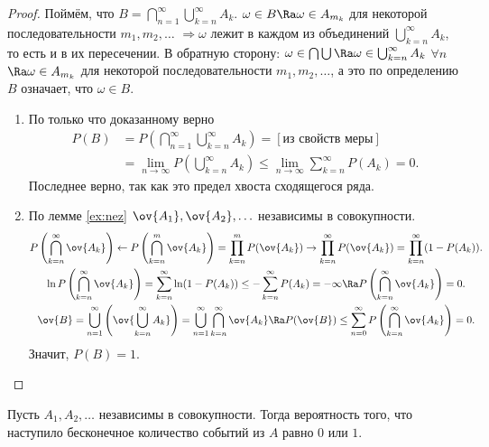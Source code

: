  \begin{proof}
      Поймём, что $B = \bigcap\limits_{n = 1}^\infty \bigcup_{k = n}^\infty A_k$. 
     $\omega \in B \Ra \omega \in A_{m_k} $ для некоторой последовательности $m_1,m_2, \ldots$ $\Rightarrow \omega$ лежит в каждом из объединений
     $\bigcup_{k = n}^\infty A_k$, то есть и в их пересечении.
     В обратную сторону:  $\omega \in \bigcap\bigcup \Ra \omega\in\bigcup_{k = n}^\infty A_k $ $\forall n$ $\Ra \omega\in A_{m_k}$ для
     некоторой последовательности $m_1, m_2, \ldots$, а это по определению $B$ означает, что $\omega\in B$.
    \begin{enumerate}
        \item По только что доказанному верно
        \begin{align*}
            P(B) &= P\left(\bigcap_{n = 1}^\infty \bigcup_{k = n}^\infty A_k\right) = [\text{из свойств меры}]
            \\ &= \underset{n\to \infty}{\lim}
         P\left(\bigcup_{k = n}^\infty A_k\right) \le \underset{n\to\infty}{\lim} \sum_{k = n}^\infty P(A_k) = 0.
        \end{align*}
        Последнее верно, так как это предел хвоста сходящегося ряда.
        \item По лемме \ref{ex:nez} $\ov{A_1}, \ov{A_2}, \ldots$ независимы в совокупности.
        \begin{gather*}
            P\left(\bigcap_{k = n}^\infty \ov{A_k}\right) \leftarrow P\left(\bigcap_{k = n}^m \ov{A_k}\right) = \prod_{k = n}^m P(\ov{A_k}) \rightarrow  \prod_{k = n}^\infty
         P(\ov{A_k}) =  \prod_{k = n}^\infty (1 - P(A_k)).\\
          \ln P\left(\bigcap_{k = n}^\infty \ov{A_k}\right) = \sum_{k = n}^\infty \ln (1 - P(A_k)) \le - \sum_{k = n}^\infty P(A_k)  = -\infty \Ra
         P\left(\bigcap_{k = n}^\infty \ov{A_k}\right) = 0.\\
         \ov{B} = \bigcup_{n = 1}^\infty\left(\ov{\bigcup_{k = n}^\infty A_k}\right) = \bigcup_{n = 1}^\infty\bigcap_{k = n}^\infty \ov{A_k}
         \Ra P(\ov{B}) \le \sum_{n = 0}^\infty P\left(\bigcap_{k = n}^\infty \ov{A_k}\right) = 0.
        \end{gather*}
         Значит, $P(B) = 1$. \qedhere
    \end{enumerate}
 \end{proof}

 \begin{corollary} Пусть $A_1, A_2, \ldots$ независимы в совокупности. Тогда вероятность того, что наступило бесконечное количество событий из $A$ равно $0$ или $1$.
 \end{corollary}

